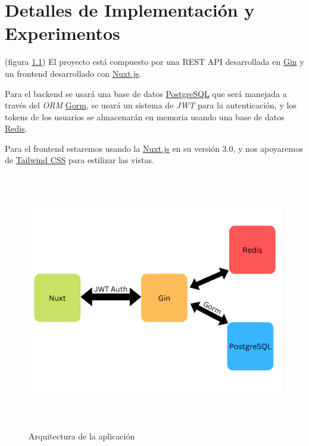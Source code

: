 \chapter{Detalles de Implementación y Experimentos}\label{chapter:implementation}

(figura \ref{fig:arquitecture}) El proyecto está compuesto por una REST API desarrollada en \href{https://gin-gonic.com/}{Gin} y un frontend desarrollado con \href{https://nuxtjs.org/}{Nuxt.js}.
\newline

Para el backend se usará una base de datos \href{https://www.postgresql.org/}{PostgreSQL} que será manejada a través del \textit{ORM} \href{https://gorm.io/}{Gorm}, se usará un sistema de \textit{JWT} para la autenticación, y los tokens de los usuarios se almacenarán en memoria usando una base de datos \href{https://redis.io/}{Redis}.
\newline

Para el frontend estaremos usando la \href{https://nuxtjs.org/}{Nuxt.js} en su versión 3.0, y nos apoyaremos de \href{https://tailwindcss.com/}{Tailwind CSS} para estilizar las vistas.

\begin{figure}[h]
	\includegraphics[width=15cm, height=11.25cm]{arquitecture.png}
	\caption{Arquitectura de la aplicación}
	\label{fig:arquitecture}
\end{figure}



